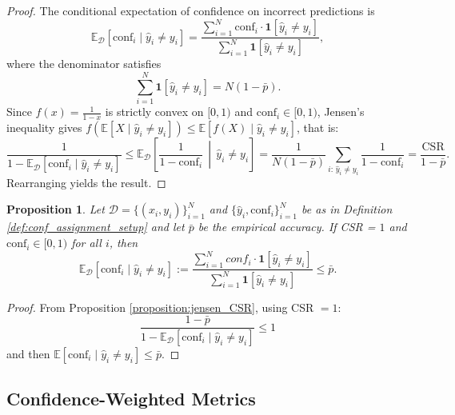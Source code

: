 \documentclass{article}
\theoremstyle{plain}
\newtheorem{theorem}{Proposition}
\theoremstyle{definition}
\theoremstyle{remark}
\begin{document}
\begin{proof}
The conditional expectation of confidence on incorrect predictions is
\[
    \mathbb{E}_{\mathcal{D}}[\mathrm{conf}_i \mid \hat{y}_i \neq y_i] 
    = \frac{\sum_{i=1}^N \mathrm{conf}_i \cdot \mathbf{1}[\hat{y}_i \neq y_i]}
           {\sum_{i=1}^N \mathbf{1}[\hat{y}_i \neq y_i]},
\]
where the denominator satisfies
\[
    \sum_{i=1}^N \mathbf{1}[\hat{y}_i \neq y_i] = N(1 - \bar{p}).
\]
Since $f(x) = \frac{1}{1-x}$ is strictly convex on $[0,1)$ and $\mathrm{conf}_i \in [0,1)$, 
Jensen's inequality gives $f(\mathbb{E}[X \mid \hat{y}_i \neq y_i]) \leq \mathbb{E}[f(X) \mid \hat{y}_i \neq y_i]$, 
that is:
\[
    \frac{1}{1 - \mathbb{E}_{\mathcal{D}}[\mathrm{conf}_i \mid \hat{y}_i \neq y_i]}
    \leq \mathbb{E}_{\mathcal{D}}\!\left[\frac{1}{1 - \mathrm{conf}_i} \,\middle|\, \hat{y}_i \neq y_i \right]
    = \frac{1}{N(1-\bar{p})} \sum_{i:\,\hat{y}_i \neq y_i} \frac{1}{1 - \mathrm{conf}_i}
    = \frac{\mathrm{CSR}}{1 - \bar{p}}.
\]
Rearranging yields the result.
\end{proof}
\bigskip





\begin{theorem} \label{proposition:_average_of_confidences for_incorrect_under_CSR_one}
Let $\mathcal{D} = \{(x_i, y_i)\}_{i=1}^N$ and $\{\hat{y}_i, \text{conf}_i\}_{i=1}^N$ be as in Definition \ref{def:conf_assignment_setup} and let $\bar{p}$ be the empirical accuracy.  If CSR = $ 1$ and $\text{conf}_i \in [0,1)$ for all $i$, then  \[
\mathbb{E}_{\mathcal{D}}[\text{conf}_i \mid \hat{y}_i \neq y_i] :=  \frac{\sum_{i=1}^N  conf_i \cdot \mathbf{1}[\hat{y}_i \neq y_i]}{\sum_{i=1}^N  \mathbf{1}[\hat{y}_i \neq y_i]} \leq \bar{p}. 
\] 
\end{theorem}
\begin{proof}
From Proposition \ref{proposition:jensen_CSR}, using CSR $ = 1$:  \[
\frac{1 - \bar{p}}{1- \mathbb{E}_{\mathcal{D}}[\text{conf}_i \mid \hat{y}_i \neq y_i]  } \leq  1
\]
and then $\mathbb{E}[\text{conf}_i \mid \hat{y}_i \neq y_i ]  \leq   \bar{p}.$
\end{proof}
\bigskip


\subsection{Confidence-Weighted Metrics}
\end{document}
